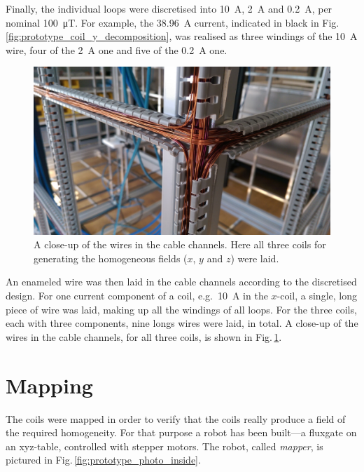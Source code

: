 
Finally, the individual loops were discretised into \SI{10}{\ampere}, \SI{2}{\ampere} and \SI{0.2}{\ampere}, per nominal \SI{100}{\micro\tesla}. For example, the \SI{38.96}{\ampere} current, indicated in black in Fig.\,\ref{fig:prototype_coil_y_decomposition}, was realised as three windings of the \SI{10}{\ampere} wire, four of the \SI{2}{\ampere} one and five of the \SI{0.2}{\ampere} one.

\begin{figure}
  \centering
  \includegraphics[width=0.9\linewidth]{gfx/prototype/wires_close_up.jpg}
  \caption{A close-up of the wires in the cable channels. Here all three coils for generating the homogeneous fields ($x$, $y$ and $z$) were laid.}
  \label{fig:prototype_coil_wire_close-up}
\end{figure}

An enameled wire was then laid in the cable channels according to the discretised design. For one current component of a coil, e.g.\ \SI{10}{\ampere} in the $x$-coil, a single, long piece of wire was laid, making up all the windings of all loops. For the three coils, each with three components, nine longs wires were laid, in total.
A close-up of the wires in the cable channels, for all three coils, is shown in Fig.\,\ref{fig:prototype_coil_wire_close-up}.




\section{Mapping}
The coils were mapped in order to verify that the coils really produce a field of the required homogeneity. For that purpose a robot has been built---a fluxgate on an xyz-table, controlled with stepper motors. The robot, called \emph{mapper}, is pictured in Fig.\,\ref{fig:prototype_photo_inside}.


